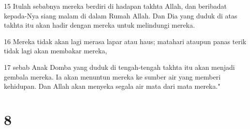 \par 15 Itulah sebabnya mereka berdiri di hadapan takhta Allah, dan beribadat kepada-Nya siang malam di dalam Rumah Allah. Dan Dia yang duduk di atas takhta itu akan hadir dengan mereka untuk melindungi mereka.
\par 16 Mereka tidak akan lagi merasa lapar atau haus; matahari ataupun panas terik tidak lagi akan membakar mereka,
\par 17 sebab Anak Domba yang duduk di tengah-tengah takhta itu akan menjadi gembala mereka. Ia akan menuntun mereka ke sumber air yang memberi kehidupan. Dan Allah akan menyeka segala air mata dari mata mereka."

\chapter{8}

